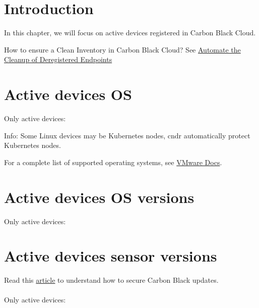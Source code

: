 \section{Introduction}

In this chapter, we will focus on \gls{active} devices registered in Carbon Black Cloud.\\

\begin{tipblock}
How to ensure a Clean Inventory in Carbon Black Cloud? See 
\href{https://carbonblack.vmware.com/blog/automate-cleanup-deregistered-endpoints}{Automate the Cleanup of Deregistered Endpoints}
\end{tipblock}

\section{Active devices OS}

Only \gls{active} devices:



 \begin{noteblock}
Info: Some Linux devices may be Kubernetes nodes, \gls{cndr} automatically protect Kubernetes nodes.
\end{noteblock} 

For a complete list of supported operating systems, see \href{https://docs.vmware.com/en/VMware-Carbon-Black-Cloud/services/cbc-endpoint-standard-oer/GUID-45BFDC75-748B-4E05-8B38-190B59204D0B.html}{VMware Docs}.\\

\newpage

\section{Active devices OS versions}

Only \gls{active} devices:



\section{Active devices sensor versions}

Read this \href{https://carbonblack.vmware.com/resource/secure-carbon-black-cloud-updates}{article} to understand how to secure Carbon Black updates.\\
\\
Only \gls{active} devices:

